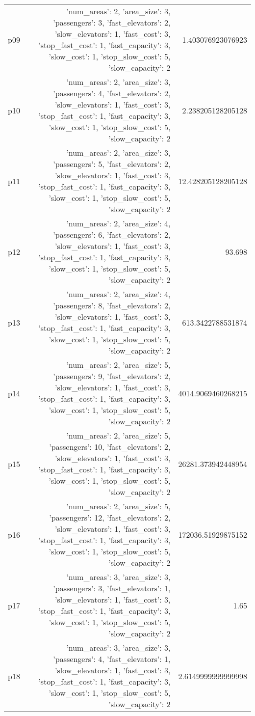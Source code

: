 \documentclass{article}
\begin{document}
\begin{center}
\begin{tabular}{r|r|r}
  p09&{'num\_areas': 2, 'area\_size': 3, 'passengers': 3, 'fast\_elevators': 2, 'slow\_elevators': 1, 'fast\_cost': 3, 'stop\_fast\_cost': 1, 'fast\_capacity': 3, 'slow\_cost': 1, 'stop\_slow\_cost': 5, 'slow\_capacity': 2}&1.403076923076923\\
  p10&{'num\_areas': 2, 'area\_size': 3, 'passengers': 4, 'fast\_elevators': 2, 'slow\_elevators': 1, 'fast\_cost': 3, 'stop\_fast\_cost': 1, 'fast\_capacity': 3, 'slow\_cost': 1, 'stop\_slow\_cost': 5, 'slow\_capacity': 2}&2.238205128205128\\
  p11&{'num\_areas': 2, 'area\_size': 3, 'passengers': 5, 'fast\_elevators': 2, 'slow\_elevators': 1, 'fast\_cost': 3, 'stop\_fast\_cost': 1, 'fast\_capacity': 3, 'slow\_cost': 1, 'stop\_slow\_cost': 5, 'slow\_capacity': 2}&12.428205128205128\\
  p12&{'num\_areas': 2, 'area\_size': 4, 'passengers': 6, 'fast\_elevators': 2, 'slow\_elevators': 1, 'fast\_cost': 3, 'stop\_fast\_cost': 1, 'fast\_capacity': 3, 'slow\_cost': 1, 'stop\_slow\_cost': 5, 'slow\_capacity': 2}&93.698\\
  p13&{'num\_areas': 2, 'area\_size': 4, 'passengers': 8, 'fast\_elevators': 2, 'slow\_elevators': 1, 'fast\_cost': 3, 'stop\_fast\_cost': 1, 'fast\_capacity': 3, 'slow\_cost': 1, 'stop\_slow\_cost': 5, 'slow\_capacity': 2}&613.3422788531874\\
  p14&{'num\_areas': 2, 'area\_size': 5, 'passengers': 9, 'fast\_elevators': 2, 'slow\_elevators': 1, 'fast\_cost': 3, 'stop\_fast\_cost': 1, 'fast\_capacity': 3, 'slow\_cost': 1, 'stop\_slow\_cost': 5, 'slow\_capacity': 2}&4014.9069460268215\\
  p15&{'num\_areas': 2, 'area\_size': 5, 'passengers': 10, 'fast\_elevators': 2, 'slow\_elevators': 1, 'fast\_cost': 3, 'stop\_fast\_cost': 1, 'fast\_capacity': 3, 'slow\_cost': 1, 'stop\_slow\_cost': 5, 'slow\_capacity': 2}&26281.373942448954\\
  p16&{'num\_areas': 2, 'area\_size': 5, 'passengers': 12, 'fast\_elevators': 2, 'slow\_elevators': 1, 'fast\_cost': 3, 'stop\_fast\_cost': 1, 'fast\_capacity': 3, 'slow\_cost': 1, 'stop\_slow\_cost': 5, 'slow\_capacity': 2}&172036.51929875152\\
  p17&{'num\_areas': 3, 'area\_size': 3, 'passengers': 3, 'fast\_elevators': 1, 'slow\_elevators': 1, 'fast\_cost': 3, 'stop\_fast\_cost': 1, 'fast\_capacity': 3, 'slow\_cost': 1, 'stop\_slow\_cost': 5, 'slow\_capacity': 2}&1.65\\
  p18&{'num\_areas': 3, 'area\_size': 3, 'passengers': 4, 'fast\_elevators': 1, 'slow\_elevators': 1, 'fast\_cost': 3, 'stop\_fast\_cost': 1, 'fast\_capacity': 3, 'slow\_cost': 1, 'stop\_slow\_cost': 5, 'slow\_capacity': 2}&2.6149999999999998\\

\end{tabular}
\end{center}
\end{document}
